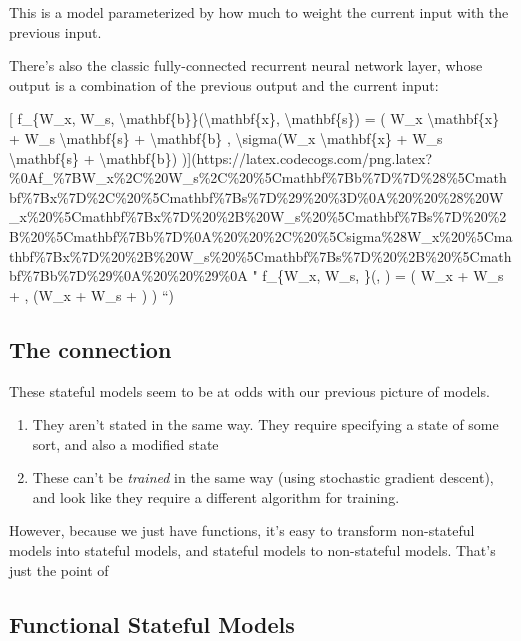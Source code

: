 \documentclass[]{article}
\begin{document}
This is a model parameterized by how much to weight the current input with the
previous input.

There's also the classic fully-connected recurrent neural network layer, whose
output is a combination of the previous output and the current input:

{[} f\_\{W\_x, W\_s, \textbackslash{}mathbf\{b\}\}(\textbackslash{}mathbf\{x\},
\textbackslash{}mathbf\{s\}) = ( W\_x \textbackslash{}mathbf\{x\} + W\_s
\textbackslash{}mathbf\{s\} + \textbackslash{}mathbf\{b\} ,
\textbackslash{}sigma(W\_x \textbackslash{}mathbf\{x\} + W\_s
\textbackslash{}mathbf\{s\} + \textbackslash{}mathbf\{b\})
){]}(https://latex.codecogs.com/png.latex?\%0Af\_\%7BW\_x\%2C\%20W\_s\%2C\%20\%5Cmathbf\%7Bb\%7D\%7D\%28\%5Cmathbf\%7Bx\%7D\%2C\%20\%5Cmathbf\%7Bs\%7D\%29\%20\%3D\%0A\%20\%20\%28\%20W\_x\%20\%5Cmathbf\%7Bx\%7D\%20\%2B\%20W\_s\%20\%5Cmathbf\%7Bs\%7D\%20\%2B\%20\%5Cmathbf\%7Bb\%7D\%0A\%20\%20\%2C\%20\%5Csigma\%28W\_x\%20\%5Cmathbf\%7Bx\%7D\%20\%2B\%20W\_s\%20\%5Cmathbf\%7Bs\%7D\%20\%2B\%20\%5Cmathbf\%7Bb\%7D\%29\%0A\%20\%20\%29\%0A
" f\_\{W\_x, W\_s, \}(, ) = ( W\_x  +
W\_s  +  , \sigma(W\_x  + W\_s  +
) ) ``)

\hypertarget{the-connection}{%
\subsection{The connection}\label{the-connection}}

These stateful models seem to be at odds with our previous picture of models.

\begin{enumerate}
\def\labelenumi{\arabic{enumi}.}
\tightlist
\item
  They aren't stated in the same way. They require specifying a state of some
  sort, and also a modified state
\item
  These can't be \emph{trained} in the same way (using stochastic gradient
  descent), and look like they require a different algorithm for training.
\end{enumerate}

However, because we just have functions, it's easy to transform non-stateful
models into stateful models, and stateful models to non-stateful models. That's
just the point of

\hypertarget{functional-stateful-models}{%
\subsection{Functional Stateful Models}\label{functional-stateful-models}}
\end{document}
